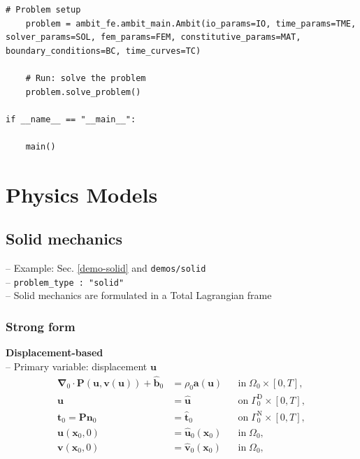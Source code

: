 \documentclass[a4paper,12pt]{report}
\newcommand{\bs}[1]{\boldsymbol{#1}}
\begin{document}
\begin{Verbatim}[breaklines=true]
    # Problem setup
    problem = ambit_fe.ambit_main.Ambit(io_params=IO, time_params=TME, solver_params=SOL, fem_params=FEM, constitutive_params=MAT, boundary_conditions=BC, time_curves=TC)

    # Run: solve the problem
    problem.solve_problem()
    
if __name__ == "__main__":

    main()
\end{Verbatim}

\section{Physics Models}\label{physics-models}

\subsection{Solid mechanics}\label{solid-mechanics}

-- Example: Sec. \ref{demo-solid} and \verb"demos/solid"\\

-- \verb.problem_type : "solid".\\

-- Solid mechanics are formulated in a Total Lagrangian frame

\subsubsection{Strong form}

\textbf{Displacement-based}\\

-- Primary variable: displacement $\bs{u}$
\begin{equation}
\label{equation-solid-strong-form}
\begin{aligned}
\bs{\nabla}_{0} \cdot \bs{P}(\bs{u},\bs{v}(\bs{u})) + \hat{\bs{b}}_{0} &= \rho_{0} \bs{a}(\bs{u}) &&\text{in} \; \mathit{\Omega}_{0} \times [0, T], \\
\bs{u} &= \hat{\bs{u}} &&\text{on} \; \mathit{\Gamma}_{0}^{\mathrm{D}} \times [0, T],\\
\bs{t}_{0} = \bs{P}\bs{n}_{0} &= \hat{\bs{t}}_{0} &&\text{on} \; \mathit{\Gamma}_{0}^{\mathrm{N}} \times [0, T],\\
\bs{u}(\bs{x}_{0},0) &= \hat{\bs{u}}_{0}(\bs{x}_{0}) &&\text{in} \; \mathit{\Omega}_{0},\\
\bs{v}(\bs{x}_{0},0) &= \hat{\bs{v}}_{0}(\bs{x}_{0}) &&\text{in} \; \mathit{\Omega}_{0},
\end{aligned}
\end{equation}
\end{document}
